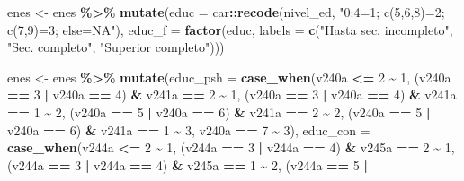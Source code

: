 \documentclass[
]{article}
\newenvironment{Shaded}{\begin{snugshade}}{\end{snugshade}}
\newcommand{\AttributeTok}[1]{\textcolor[rgb]{0.13,0.29,0.53}{#1}}
\newcommand{\DecValTok}[1]{\textcolor[rgb]{0.00,0.00,0.81}{#1}}
\newcommand{\FunctionTok}[1]{\textcolor[rgb]{0.13,0.29,0.53}{\textbf{#1}}}
\newcommand{\NormalTok}[1]{#1}
\newcommand{\OtherTok}[1]{\textcolor[rgb]{0.56,0.35,0.01}{#1}}
\newcommand{\SpecialCharTok}[1]{\textcolor[rgb]{0.81,0.36,0.00}{\textbf{#1}}}
\newcommand{\StringTok}[1]{\textcolor[rgb]{0.31,0.60,0.02}{#1}}
\begin{document}
\begin{Shaded}
\begin{Highlighting}[]
\NormalTok{enes }\OtherTok{\textless{}{-}}\NormalTok{ enes }\SpecialCharTok{\%\textgreater{}\%}
    \FunctionTok{mutate}\NormalTok{(}\AttributeTok{educ =}\NormalTok{ car}\SpecialCharTok{::}\FunctionTok{recode}\NormalTok{(nivel\_ed, }\StringTok{"0:4=1; c(5,6,8)=2; c(7,9)=3; else=NA"}\NormalTok{),}
        \AttributeTok{educ\_f =} \FunctionTok{factor}\NormalTok{(educ, }\AttributeTok{labels =} \FunctionTok{c}\NormalTok{(}\StringTok{"Hasta sec. incompleto"}\NormalTok{, }\StringTok{"Sec. completo"}\NormalTok{,}
            \StringTok{"Superior completo"}\NormalTok{)))}

\NormalTok{enes }\OtherTok{\textless{}{-}}\NormalTok{ enes }\SpecialCharTok{\%\textgreater{}\%}
    \FunctionTok{mutate}\NormalTok{(}\AttributeTok{educ\_psh =} \FunctionTok{case\_when}\NormalTok{(v240a }\SpecialCharTok{\textless{}=} \DecValTok{2} \SpecialCharTok{\textasciitilde{}} \DecValTok{1}\NormalTok{, (v240a }\SpecialCharTok{==} \DecValTok{3} \SpecialCharTok{|}\NormalTok{ v240a }\SpecialCharTok{==} \DecValTok{4}\NormalTok{) }\SpecialCharTok{\&}\NormalTok{ v241a }\SpecialCharTok{==}
        \DecValTok{2} \SpecialCharTok{\textasciitilde{}} \DecValTok{1}\NormalTok{, (v240a }\SpecialCharTok{==} \DecValTok{3} \SpecialCharTok{|}\NormalTok{ v240a }\SpecialCharTok{==} \DecValTok{4}\NormalTok{) }\SpecialCharTok{\&}\NormalTok{ v241a }\SpecialCharTok{==} \DecValTok{1} \SpecialCharTok{\textasciitilde{}} \DecValTok{2}\NormalTok{, (v240a }\SpecialCharTok{==} \DecValTok{5} \SpecialCharTok{|}\NormalTok{ v240a }\SpecialCharTok{==}
        \DecValTok{6}\NormalTok{) }\SpecialCharTok{\&}\NormalTok{ v241a }\SpecialCharTok{==} \DecValTok{2} \SpecialCharTok{\textasciitilde{}} \DecValTok{2}\NormalTok{, (v240a }\SpecialCharTok{==} \DecValTok{5} \SpecialCharTok{|}\NormalTok{ v240a }\SpecialCharTok{==} \DecValTok{6}\NormalTok{) }\SpecialCharTok{\&}\NormalTok{ v241a }\SpecialCharTok{==} \DecValTok{1} \SpecialCharTok{\textasciitilde{}} \DecValTok{3}\NormalTok{, v240a }\SpecialCharTok{==}
        \DecValTok{7} \SpecialCharTok{\textasciitilde{}} \DecValTok{3}\NormalTok{), }\AttributeTok{educ\_con =} \FunctionTok{case\_when}\NormalTok{(v244a }\SpecialCharTok{\textless{}=} \DecValTok{2} \SpecialCharTok{\textasciitilde{}} \DecValTok{1}\NormalTok{, (v244a }\SpecialCharTok{==} \DecValTok{3} \SpecialCharTok{|}\NormalTok{ v244a }\SpecialCharTok{==} \DecValTok{4}\NormalTok{) }\SpecialCharTok{\&}
\NormalTok{        v245a }\SpecialCharTok{==} \DecValTok{2} \SpecialCharTok{\textasciitilde{}} \DecValTok{1}\NormalTok{, (v244a }\SpecialCharTok{==} \DecValTok{3} \SpecialCharTok{|}\NormalTok{ v244a }\SpecialCharTok{==} \DecValTok{4}\NormalTok{) }\SpecialCharTok{\&}\NormalTok{ v245a }\SpecialCharTok{==} \DecValTok{1} \SpecialCharTok{\textasciitilde{}} \DecValTok{2}\NormalTok{, (v244a }\SpecialCharTok{==} \DecValTok{5} \SpecialCharTok{|}

\end{Highlighting}
\end{Shaded}
\end{document}
